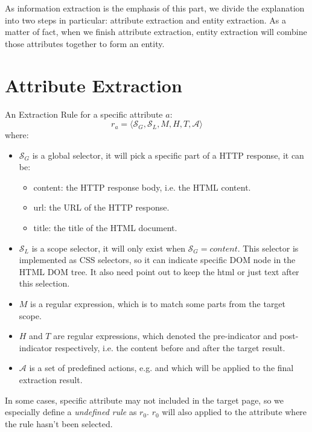 As information extraction is the emphasis of this part, we divide the explanation into two steps in particular: attribute extraction and entity extraction. As a matter of fact, when we finish attribute extraction, entity extraction will combine those attributes together to form an entity.

\section{Attribute Extraction}
\begin{defn}
An Extraction Rule for a specific attribute $a$:
\begin{equation}
	r_a = \langle \mathcal{S}_G, \mathcal{S}_L,M, H, T, \mathcal{A} \rangle
\end{equation}
 where:
\begin{itemize}
	\item $\mathcal{S}_G$ is a global selector, it will pick a specific part of a HTTP response, it can be:
		\begin{itemize}
			\item content: the HTTP response body, i.e. the HTML content.
			\item url: the URL of the HTTP response. 
			\item title: the title of the HTML document. 
		\end{itemize}
	\item $\mathcal{S}_L$ is a scope selector, it will only exist when $\mathcal{S}_G=content$. This selector is implemented as CSS selectors, so it can indicate specific DOM node in the HTML DOM tree. It also need point out to keep the html or just text after this selection.
	\item $M$ is a regular expression, which is to match some parts from the target scope.
	\item $H$ and $T$ are regular expressions, which denoted the pre-indicator and post-indicator respectively, i.e. the content before and after the target result.
	\item $\mathcal{A}$ is a set of predefined actions, e.g.  and  which will be applied to the final extraction result. 
\end{itemize}
\end{defn}

In some cases, specific attribute may not included in the target page, so we especially define a \textit{undefined rule} as $r_0$. $r_0$ will also applied to the attribute where the rule hasn't been selected.

